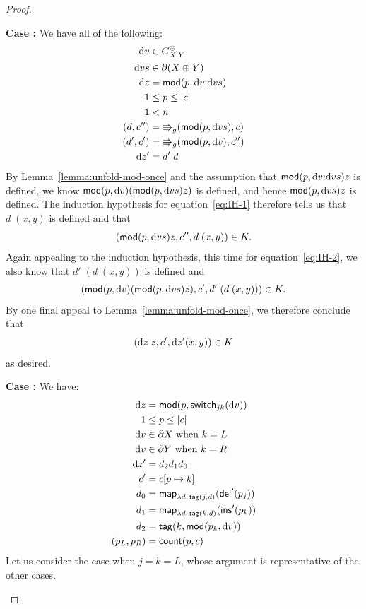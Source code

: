 \begin{proof}
{\begin{trivlist}
\item {\bf Case :}
    We have all of the following:
    \begin{align}
        \textrm{d} v &\in G^\oplus_{X,Y} \\
        \textrm{d} v s &\in \partial(X\oplus Y) \\
        \textrm{d} z &= \mathsf{mod}(p,\textrm{d} v\mathord{:}\textrm{d} v s) \\
        1 &\le p \le |c| \\
        1 &< n \\
        (d,c'') &= \mathord{\Rrightarrow}_g(\mathsf{mod}(p,\textrm{d} v s),c) \label{eq:IH-1} \\
        (d',c') &= \mathord{\Rrightarrow}_g(\mathsf{mod}(p,\textrm{d} v),c'') \label{eq:IH-2} \\
        \textrm{d} z' &= d'\;d
    \end{align}
    By Lemma~\ref{lemma:unfold-mod-once} and the assumption that $\mathsf{mod}(p,\textrm{d} v\mathord{:}\textrm{d} v s)z$ is defined, we know $\mathsf{mod}(p,\textrm{d} v)(\mathsf{mod}(p,\textrm{d} v s)z)$ is
    defined, and hence $\mathsf{mod}(p,\textrm{d} v s)z$ is defined. The induction
    hypothesis for equation~\ref{eq:IH-1} therefore tells us that $d\;(x,y)$
    is defined and that
    \[(\mathsf{mod}(p,\textrm{d} v s)z,c'',d\;(x,y)) \in K.\]
    Again appealing to the induction hypothesis, this time for
    equation~\ref{eq:IH-2}, we also know that $d'\;(d\;(x,y))$ is defined and
    \[(\mathsf{mod}(p,\textrm{d} v)(\mathsf{mod}(p,\textrm{d} v s)z),c',d'\;(d\;(x,y))) \in K.\]
    By one final appeal to Lemma~\ref{lemma:unfold-mod-once}, we therefore
    conclude that
    \[(\textrm{d} z\;z,c',\textrm{d} z'(x,y)) \in K\]
    as desired.

\item {\bf Case :}
    We have:
    \begin{align*}
        \textrm{d} z &= \mathsf{mod}(p,\mathsf{switch}_{jk}(\textrm{d} v)) \\
        1 &\le p \le |c| \\
        \textrm{d} v &\in \partial X\mbox{ when }k = L \\
        \textrm{d} v &\in \partial Y\mbox{ when }k = R \\
        \textrm{d} z' &= d_2d_1d_0 \\
        c' &= c[p \mapsto k] \\
        d_0 &= \mathsf{map}_{\lambda d.\,\mathsf{tag}(j,d)}(\mathsf{del}'(p_j)) \\
        d_1 &= \mathsf{map}_{\lambda d.\,\mathsf{tag}(k,d)}(\mathsf{ins}'(p_k)) \\
        d_2 &= \mathsf{tag}(k,\mathsf{mod}(p_k,\textrm{d} v)) \\
        (p_L,p_R) &= \mathsf{count}(p,c)
    \end{align*}
    Let us consider the case when $j=k=L$, whose argument is representative
    of the other cases.


\end{trivlist}}
\end{proof}
